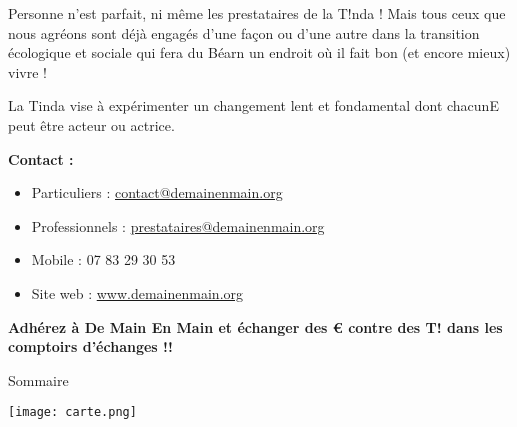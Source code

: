\noindent Personne n’est parfait, ni même les prestataires de la T!nda ! Mais tous ceux que nous agréons sont déjà engagés
d’une façon ou d’une autre dans la transition écologique et sociale qui fera du Béarn un endroit où il fait bon (et
encore mieux) vivre !
    \vspace{.2cm}

\noindent La Tinda vise à expérimenter un changement lent et fondamental dont chacunE peut être acteur ou actrice.

    \vspace{1cm}

      \textbf{Contact :}
    \begin{itemize}
      \item[] Particuliers : \href{mailto:contact@demainenmain.org}{contact@demainenmain.org}
      \item[] Professionnels : \href{mailto:prestataires@demainenmain.org}{prestataires@demainenmain.org}
      \item[] Mobile : 07 83 29 30 53 
      \item[] Site web : \href{https://www.demainenmain.org}{www.demainenmain.org}
    \end{itemize}

    \vspace{1cm}

  \begin{center}
    {\Large \textbf{Adhérez à De Main En Main et échanger des € contre des T! dans les comptoirs d’échanges !!}}
  \end{center}

  \pagebreak

  \begin{center}
    \vspace{5cm}
    {\Huge Sommaire}
    {\Large

  \parbox{11cm}{\tableofcontents}
    }
  \end{center}

\pagebreak

  \begin{center}
    \texttt{[image: carte.png]}
  \end{center}

\pagebreak
